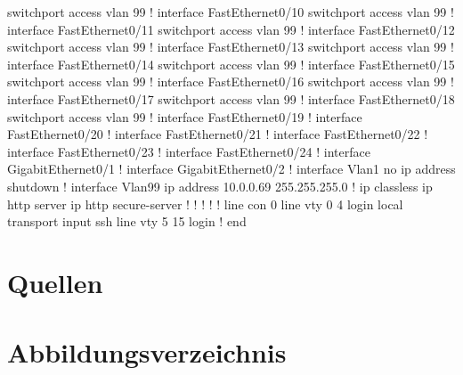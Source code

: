 \documentclass[a4paper]{article}
\begin{document}
 switchport access vlan 99
!
interface FastEthernet0/10
 switchport access vlan 99
!
interface FastEthernet0/11
 switchport access vlan 99
!
interface FastEthernet0/12
 switchport access vlan 99
!
interface FastEthernet0/13
 switchport access vlan 99
!
interface FastEthernet0/14
 switchport access vlan 99
!
interface FastEthernet0/15
 switchport access vlan 99
!
interface FastEthernet0/16
 switchport access vlan 99
!
interface FastEthernet0/17
 switchport access vlan 99
!
interface FastEthernet0/18
 switchport access vlan 99
!
interface FastEthernet0/19
!
interface FastEthernet0/20
!
interface FastEthernet0/21
!
interface FastEthernet0/22
!
interface FastEthernet0/23
!
interface FastEthernet0/24
!
interface GigabitEthernet0/1
!
interface GigabitEthernet0/2
!
interface Vlan1
 no ip address
 shutdown
!
interface Vlan99
 ip address 10.0.0.69 255.255.255.0
!
ip classless
ip http server
ip http secure-server
!
!
!
!
!
line con 0
line vty 0 4
 login local
 transport input ssh
line vty 5 15
 login
!
end
\newpage

\section{Quellen}

\newpage
\section{Abbildungsverzeichnis}

\listoffigures
\end{document}
